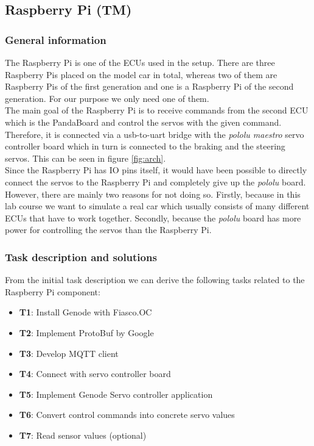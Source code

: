 \subsection{Raspberry Pi (TM)}
\label{sec:rpi}


\subsubsection{General information}
The Raspberry Pi is one of the ECUs used in the setup. There are three Raspberry Pis placed on the model car in total, whereas two of them are Raspberry Pis of the first generation and one is a Raspberry Pi of the second generation. For our purpose we only need one of them. \\

The main goal of the Raspberry Pi is to receive commands from the second ECU which is the PandaBoard and control the servos with the given command. Therefore, it is connected via a usb-to-uart bridge with the \textit{pololu maestro} servo controller board which in turn is connected to the braking and the steering servos. This can be seen in figure \ref{fig:arch}. \\

Since the Raspberry Pi has IO pins itself, it would have been possible to directly connect the servos to the Raspberry Pi and completely give up the \textit{pololu} board. However, there are mainly two reasons for not doing so. Firstly, because in this lab course we want to simulate a real car which usually consists of many different ECUs that have to work together. Secondly, because the \textit{pololu} board has more power for controlling the servos than the Raspberry Pi. 


\subsubsection{Task description and solutions}
\label{sec:rpi-req}
From the initial task description we can derive the following tasks related to the Raspberry Pi component:

\begin{itemize}
    \item \textbf{T1}: Install Genode with Fiasco.OC
    \item \textbf{T2}: Implement ProtoBuf by Google
    \item \textbf{T3}: Develop MQTT client
    \item \textbf{T4}: Connect with servo controller board
    \item \textbf{T5}: Implement Genode Servo controller application
    \item \textbf{T6}: Convert control commands into concrete servo values
    \item \textbf{T7}: Read sensor values (optional)
\end{itemize}

